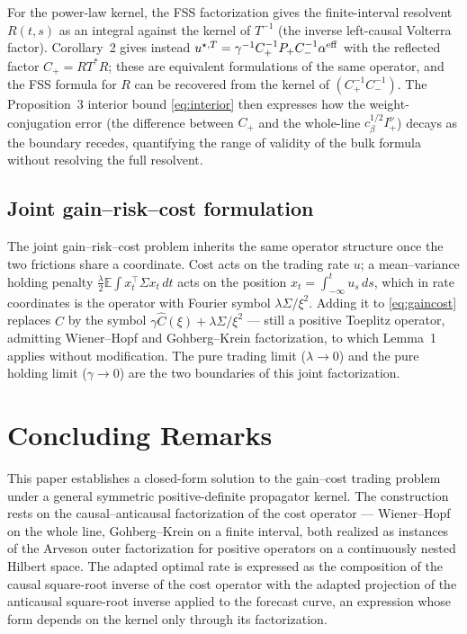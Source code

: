 \documentclass[11pt]{article}
\newcommand{\E}{\mathbb{E}}
\theoremstyle{plain}
\begin{document}
For the power-law kernel, the FSS factorization \citep{FordeSanchezSmith2022} gives the finite-interval resolvent $R(t,s)$ as an integral against the kernel of $T^{-1}$ (the inverse left-causal Volterra factor). Corollary~2 gives instead $u^{\star,T} = \gamma^{-1}C_+^{-1}P_+C_-^{-1}\alpha^{\rm eff}$ with the reflected factor $C_+ = RT^*R$; these are equivalent formulations of the same operator, and the FSS formula for $R$ can be recovered from the kernel of $(C_+^{-1}C_-^{-1})$. The Proposition~3 interior bound \eqref{eq:interior} then expresses how the weight-conjugation error (the difference between $C_+$ and the whole-line $c_\beta^{1/2}I_+^\nu$) decays as the boundary recedes, quantifying the range of validity of the bulk formula without resolving the full resolvent.

\subsection{Joint gain--risk--cost formulation}

The joint gain--risk--cost problem inherits the same operator structure once the two frictions share a coordinate. Cost acts on the trading rate $u$; a mean--variance holding penalty $\tfrac{\lambda}{2}\E\int x_t^\top\Sigma x_t\,dt$ acts on the position $x_t = \int_{-\infty}^t u_s\,ds$, which in rate coordinates is the operator with Fourier symbol $\lambda\Sigma/\xi^2$. Adding it to \eqref{eq:gaincost} replaces $C$ by the symbol $\gamma\hat C(\xi) + \lambda\Sigma/\xi^2$ --- still a positive Toeplitz operator, admitting Wiener--Hopf and Gohberg--Krein factorization, to which Lemma~1 applies without modification. The pure trading limit ($\lambda\to 0$) and the pure holding limit ($\gamma\to 0$) are the two boundaries of this joint factorization.

\section{Concluding Remarks}

This paper establishes a closed-form solution to the gain--cost trading problem under a general symmetric positive-definite propagator kernel. The construction rests on the causal--anticausal factorization of the cost operator --- Wiener--Hopf on the whole line, Gohberg--Krein on a finite interval, both realized as instances of the Arveson outer factorization for positive operators on a continuously nested Hilbert space. The adapted optimal rate is expressed as the composition of the causal square-root inverse of the cost operator with the adapted projection of the anticausal square-root inverse applied to the forecast curve, an expression whose form depends on the kernel only through its factorization.
\end{document}
